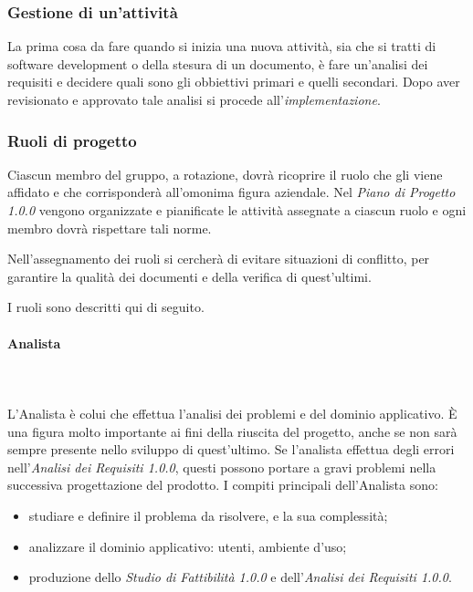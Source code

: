 			\subsubsection{Gestione di un'attività}
				La prima cosa da fare quando si inizia una nuova attività, sia che si tratti di software
				development o della stesura di un documento, è fare un'analisi dei requisiti e decidere
				quali sono gli obbiettivi primari e quelli secondari.
				Dopo aver revisionato e approvato tale analisi si procede all'\textit{implementazione}\glos.


   		\subsubsection{Ruoli di progetto}
   			Ciascun membro del gruppo, a rotazione, dovrà ricoprire il ruolo che gli viene affidato e che corrisponderà all'omonima figura aziendale. Nel \textit{Piano di Progetto 1.0.0\docs} vengono organizzate e pianificate le attività assegnate a ciascun ruolo e ogni membro dovrà rispettare tali norme.

   			Nell'assegnamento dei ruoli si cercherà di evitare situazioni di conflitto, per garantire la qualità dei documenti e della verifica di quest'ultimi.

   			I ruoli sono descritti qui di seguito.
   			\paragraph{Analista} \mbox{}\\ \mbox{}\\
   				L'Analista è colui che effettua l'analisi dei problemi e del dominio applicativo. \`{E} una figura molto importante ai fini della riuscita del progetto, anche se non sarà sempre presente nello sviluppo di quest'ultimo. Se l'analista effettua degli errori nell'\textit{Analisi dei Requisiti 1.0.0}, questi possono portare a gravi problemi nella successiva progettazione del prodotto.
   				I compiti principali dell'Analista sono:
   				\begin{itemize}
   					\item studiare e definire il problema da risolvere, e la sua complessità;
   					\item analizzare il dominio applicativo: utenti, ambiente d'uso;
   					\item produzione dello \textit{Studio di Fattibilità 1.0.0} e  dell'\textit{Analisi dei Requisiti 1.0.0}.
   				\end{itemize}
